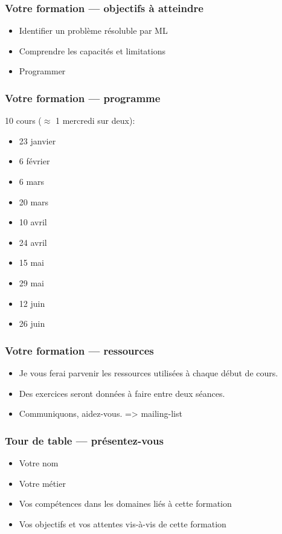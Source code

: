 \documentclass{formation}
\begin{document}
\begin{frame}
  \frametitle{Votre formation — objectifs à atteindre}
  \begin{itemize}
  \item Identifier un problème résoluble par ML
  \item Comprendre les capacités et limitations
  \item Programmer
  \end{itemize}
\end{frame}

\begin{frame}
  \frametitle{Votre formation — programme}
  10 cours ($\approx$ 1 mercredi sur deux):
  \begin{itemize}
  \item 23 janvier
  \item 6 février
  \item 6 mars
  \item 20 mars
  \item 10 avril
  \item 24 avril
  \item 15 mai
  \item 29 mai
  \item 12 juin
  \item 26 juin
  \end{itemize}
\end{frame}

\begin{frame}
  \frametitle{Votre formation — ressources}
  \begin{itemize}
    \item Je vous ferai parvenir les ressources utilisées à chaque début de cours.
    \item Des exercices seront données à faire entre deux séances.
    \item Communiquons, aidez-vous. => mailing-list
  \end{itemize}
\end{frame}

\begin{frame}
  \frametitle{Tour de table — présentez-vous}
  \begin{itemize}
  \item Votre nom
  \item Votre métier
  \item Vos compétences dans les domaines liés à cette formation
  \item Vos objectifs et vos attentes vis-à-vis de cette formation
  \end{itemize}
\end{frame}
\end{document}
